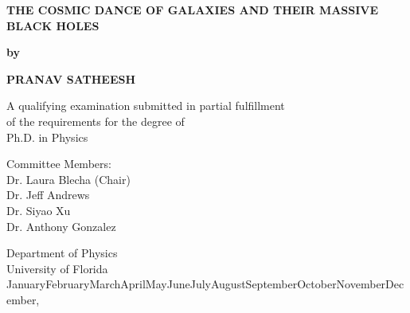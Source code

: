 \documentclass[11pt, letterpaper]{article}
\newcommand{\qetitle}{The cosmic dance of galaxies and their Massive black holes}
\newcommand{\name}{Pranav Satheesh}
\newcommand{\degreeaward}{Ph.D. in Physics}
\newcommand{\department}{Department of Physics}
\newcommand{\university}{University of Florida}
\newcommand{\monthyeardate}{\ifcase \month \or January\or February\or March\or April\or May\or June\or July\or August\or September\or October\or November\or December\fi, \number \year}
\newcommand{\chair}{Your Chair}
\newcommand{\advisor}{Your Advisor}
\newcommand{\committee}{Committee Member}
\begin{document}

\begin{titlepage}
    \begin{center}
        \vspace*{0.3in}
        \Huge{\textbf{\MakeUppercase{\qetitle}}}

        \vspace{0.35in}
        \Large{\textbf{by}}
        
        \vspace{0.45in}
        \Large{\textbf{\MakeUppercase{\name}}}
        
        \vspace{0.5in}
        \Large{A qualifying examination submitted in partial fulfillment \\
        of the requirements for the degree of \\
        \degreeaward}

        \vspace{0.8in}
        \large{Committee Members: \\
        Dr. Laura Blecha (Chair)\\
        Dr. Jeff Andrews \\
        Dr. Siyao Xu \\
        Dr. Anthony Gonzalez}
 

        \vspace{0.7in}
        \Large{\department \\
        \university \\
        \monthyeardate}
    \end{center}
\end{titlepage}


        
    
       
% 


\tableofcontents
\newpage
\end{document}

